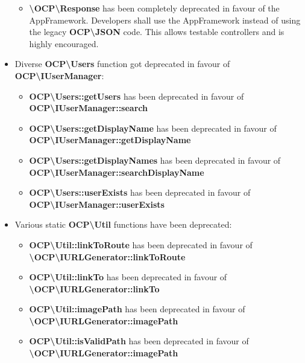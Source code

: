 \documentclass[letterpaper,10pt,english]{sphinxmanual}
\begin{document}
\begin{itemize}
\begin{itemize}
\item {} 
\textbf{\textbackslash{}OCP\textbackslash{}Response} has been completely deprecated in favour of the AppFramework. Developers shall use the AppFramework instead of using the legacy \textbf{OCP\textbackslash{}JSON} code. This allows testable controllers and is highly encouraged.

\end{itemize}

\item {} 
Diverse \textbf{OCP\textbackslash{}Users} function got deprecated in favour of \textbf{OCP\textbackslash{}IUserManager}:
\begin{itemize}
\item {} 
\textbf{OCP\textbackslash{}Users::getUsers} has been deprecated in favour of \textbf{OCP\textbackslash{}IUserManager::search}

\item {} 
\textbf{OCP\textbackslash{}Users::getDisplayName} has been deprecated in favour of \textbf{OCP\textbackslash{}IUserManager::getDisplayName}

\item {} 
\textbf{OCP\textbackslash{}Users::getDisplayNames} has been deprecated in favour of \textbf{OCP\textbackslash{}IUserManager::searchDisplayName}

\item {} 
\textbf{OCP\textbackslash{}Users::userExists} has been deprecated in favour of \textbf{OCP\textbackslash{}IUserManager::userExists}

\end{itemize}

\item {} 
Various static \textbf{OCP\textbackslash{}Util} functions have been deprecated:
\begin{itemize}
\item {} 
\textbf{OCP\textbackslash{}Util::linkToRoute} has been deprecated in favour of \textbf{\textbackslash{}OCP\textbackslash{}IURLGenerator::linkToRoute}

\item {} 
\textbf{OCP\textbackslash{}Util::linkTo} has been deprecated in favour of \textbf{\textbackslash{}OCP\textbackslash{}IURLGenerator::linkTo}

\item {} 
\textbf{OCP\textbackslash{}Util::imagePath} has been deprecated in favour of \textbf{\textbackslash{}OCP\textbackslash{}IURLGenerator::imagePath}

\item {} 
\textbf{OCP\textbackslash{}Util::isValidPath} has been deprecated in favour of \textbf{\textbackslash{}OCP\textbackslash{}IURLGenerator::imagePath}

\end{itemize}

\end{itemize}
\end{document}
